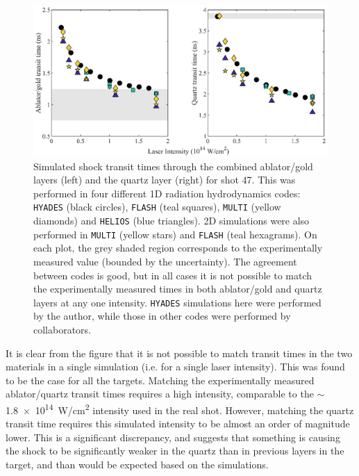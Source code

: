 \begin{figure} [h!]
\begin{centering}
\includegraphics{figures/Experiment/SimulationVertical_edit.eps}%
\caption{\label{fig:SimulationPlot} Simulated shock transit times through the combined ablator/gold layers (left) and the quartz layer (right) for shot 47. This was performed in four different 1D radiation hydrodynamics codes: \texttt{HYADES} (black circles), \texttt{FLASH} (teal squares), \texttt{MULTI} (yellow diamonds) and \texttt{HELIOS} (blue triangles). 2D simulations were also performed in \texttt{MULTI} (yellow stars) and \texttt{FLASH} (teal hexagrams). On each plot, the grey shaded region corresponds to the experimentally measured value (bounded by the uncertainty). The agreement between codes is good, but in all cases it is not possible to match the experimentally measured times in both ablator/gold and quartz layers at any one intensity. \texttt{HYADES} simulations here were performed by the author, while those in other codes were performed by collaborators.}
\end{centering}
\end{figure}

It is clear from the figure that it is not possible to match transit times in the two materials in a single simulation (i.e. for a single laser intensity). This was found to be the case for all the targets. Matching the experimentally measured ablator/quartz transit times requires a high intensity, comparable to the $\sim$\num{1.8e14}~\si[per-mode=symbol]{W/cm^2} intensity used in the real shot. However, matching the quartz transit time requires this simulated intensity to be almost an order of magnitude lower. This is a significant discrepancy, and suggests that something is causing the shock to be significantly weaker in the quartz than in previous layers in the target, and than would be expected based on the simulations. 

